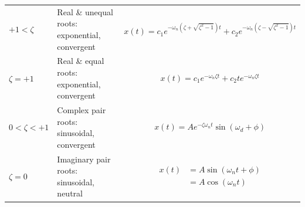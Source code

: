 \documentclass[
]{book}
\begin{document}
\begin{longtable}[]{@{}lll@{}}
\toprule
\endhead
\begin{minipage}[t]{0.13\columnwidth}\raggedright
\(+1 \lt \zeta\)\strut
\end{minipage} & \begin{minipage}[t]{0.39\columnwidth}\raggedright
Real \& unequal roots: exponential, convergent\strut
\end{minipage} & \begin{minipage}[t]{0.39\columnwidth}\raggedright
\[ x\left(t\right) = c_1 e^{-\omega_n \left( \zeta + \sqrt{\zeta^2 - 1} \right)t} + c_2 e^{-\omega_n \left( \zeta - \sqrt{\zeta^2 - 1} \right)t} \]\strut
\end{minipage}\tabularnewline
\begin{minipage}[t]{0.13\columnwidth}\raggedright
\(\zeta = +1\)\strut
\end{minipage} & \begin{minipage}[t]{0.39\columnwidth}\raggedright
Real \& equal roots: exponential, convergent\strut
\end{minipage} & \begin{minipage}[t]{0.39\columnwidth}\raggedright
\[ x\left(t\right) = c_1 e^{-\omega_n \zeta t} + c_2 t e^{-\omega_n \zeta t} \]\strut
\end{minipage}\tabularnewline
\begin{minipage}[t]{0.13\columnwidth}\raggedright
\(0 \lt \zeta \lt +1\)\strut
\end{minipage} & \begin{minipage}[t]{0.39\columnwidth}\raggedright
Complex pair roots: sinusoidal, convergent\strut
\end{minipage} & \begin{minipage}[t]{0.39\columnwidth}\raggedright
\[ x\left(t\right) =  A e^{-\zeta \omega_n t} \sin \left( \omega_d + \phi \right) \]\strut
\end{minipage}\tabularnewline
\begin{minipage}[t]{0.13\columnwidth}\raggedright
\(\zeta = 0\)\strut
\end{minipage} & \begin{minipage}[t]{0.39\columnwidth}\raggedright
Imaginary pair roots: sinusoidal, neutral\strut
\end{minipage} & \begin{minipage}[t]{0.39\columnwidth}\raggedright
\begin{align} x\left(t\right) &=  A \sin \left( \omega_n t + \phi \right) \\ &= A \cos \left( \omega_n t \right) \end{align}\strut

\end{minipage}
\end{longtable}
\end{document}
